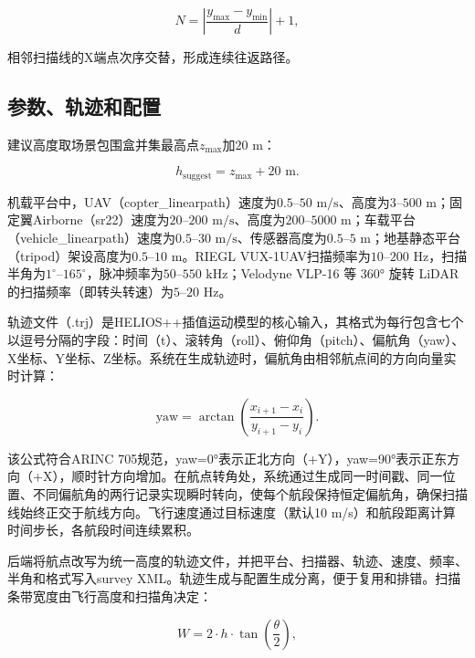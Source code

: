 \documentclass[a4paper,fleqn]{cas-sc}
\begin{document}
\begin{equation}
    N = \left| \frac{y_{\max} - y_{\min}}{d} \right| + 1,
\end{equation}

相邻扫描线的X端点次序交替，形成连续往返路径。

\subsection{参数、轨迹和配置}

建议高度取场景包围盒并集最高点$z_{\max}$加$20\text{ m}$：

\begin{equation}
    h_{\text{suggest}} = z_{\max} + 20\text{ m}.
\end{equation}

机载平台中，UAV（copter\_linearpath）速度为$0.5$--$50\text{ m/s}$、高度为$3$--$500\text{ m}$；固定翼Airborne（sr22）速度为$20$--$200\text{ m/s}$、高度为$200$--$5000\text{ m}$；车载平台（vehicle\_linearpath）速度为$0.5$--$30\text{ m/s}$、传感器高度为$0.5$--$5\text{ m}$；地基静态平台（tripod）架设高度为$0.5$--$10\text{ m}$。RIEGL VUX-1UAV扫描频率为$10$--$200\text{ Hz}$，扫描半角为$1^\circ$--$165^\circ$，脉冲频率为$50$--$550\text{ kHz}$；Velodyne VLP-16 等 360° 旋转 LiDAR 的扫描频率（即转头转速）为$5$--$20\text{ Hz}$。

轨迹文件（.trj）是HELIOS++插值运动模型的核心输入，其格式为每行包含七个以逗号分隔的字段：时间（t）、滚转角（roll）、俯仰角（pitch）、偏航角（yaw）、X坐标、Y坐标、Z坐标。系统在生成轨迹时，偏航角由相邻航点间的方向向量实时计算：

\begin{equation}
    \text{yaw} = \arctan\left(\frac{x_{i+1} - x_i}{y_{i+1} - y_i}\right).
\end{equation}

该公式符合ARINC 705规范，yaw=0°表示正北方向（+Y），yaw=90°表示正东方向（+X），顺时针方向增加。在航点转角处，系统通过生成同一时间戳、同一位置、不同偏航角的两行记录实现瞬时转向，使每个航段保持恒定偏航角，确保扫描线始终正交于航线方向。飞行速度通过目标速度（默认10 m/s）和航段距离计算时间步长，各航段时间连续累积。

后端将航点改写为统一高度的轨迹文件，并把平台、扫描器、轨迹、速度、频率、半角和格式写入survey XML。轨迹生成与配置生成分离，便于复用和排错。扫描条带宽度由飞行高度和扫描角决定：

\begin{equation}
    W = 2 \cdot h \cdot \tan\left(\frac{\theta}{2}\right),
\end{equation}
\end{document}
